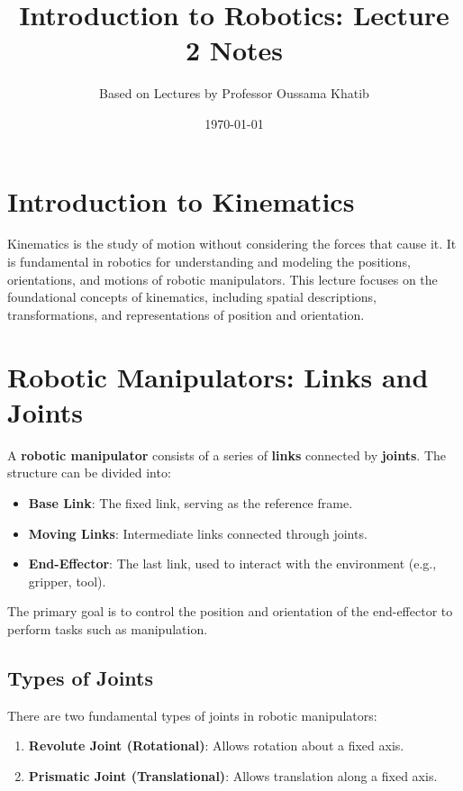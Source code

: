 \documentclass{article}
\title{Introduction to Robotics: Lecture 2 Notes}
\author{Based on Lectures by Professor Oussama Khatib}
\date{\today}
\begin{document}
\maketitle
\tableofcontents

\section{Introduction to Kinematics}

Kinematics is the study of motion without considering the forces that cause it. It is fundamental in robotics for understanding and modeling the positions, orientations, and motions of robotic manipulators. This lecture focuses on the foundational concepts of kinematics, including spatial descriptions, transformations, and representations of position and orientation.

\section{Robotic Manipulators: Links and Joints}

A \textbf{robotic manipulator} consists of a series of \textbf{links} connected by \textbf{joints}. The structure can be divided into:

\begin{itemize}
    \item \textbf{Base Link}: The fixed link, serving as the reference frame.
    \item \textbf{Moving Links}: Intermediate links connected through joints.
    \item \textbf{End-Effector}: The last link, used to interact with the environment (e.g., gripper, tool).
\end{itemize}

The primary goal is to control the position and orientation of the end-effector to perform tasks such as manipulation.

\subsection{Types of Joints}

There are two fundamental types of joints in robotic manipulators:

\begin{enumerate}
    \item \textbf{Revolute Joint (Rotational)}: Allows rotation about a fixed axis.
    \item \textbf{Prismatic Joint (Translational)}: Allows translation along a fixed axis.
\end{enumerate}
\end{document}
